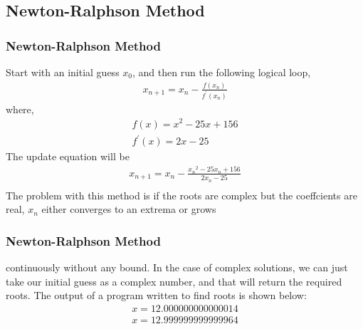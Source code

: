 \documentclass{beamer}
\providecommand{\brak}[1]{\ensuremath{\left(#1\right)}}
\theoremstyle{remark}
\numberwithin{equation}{section}
\begin{document}
    \subsection{Newton-Ralphson Method}
    \begin{frame}
      \frametitle{Newton-Ralphson Method}
      Start with an initial guess $x_0$, and then run the following logical loop,
      \begin{align}
        x_{n+1} = x_n - \frac{f\brak{x_n}}{f^{\prime}\brak{x_n}} 
      \end{align}
      where,
      \begin{align}
        f\brak{x} = x^2 - 25x + 156\\
        f^{\prime}\brak{x} = 2x - 25
      \end{align}
      The update equation will be
      \begin{align}
        x_{n+1} = x_n - \frac{{x_n}^2 - 25x_n + 156}{2x_n - 25}\\
      \end{align}
      The problem with this method is if the roots are complex but the coeffcients are real, $x_n$ either converges to an extrema or grows
    \end{frame}
    \begin{frame}
      \frametitle{Newton-Ralphson Method}
      continuously without any bound. 
      In the case of complex solutions, we can just take our initial guess as a complex number, and that will return the required roots.
      The output of a program written to find roots is shown below:
      \begin{align}
        x = 12.000000000000014 \\
        x = 12.999999999999964
      \end{align}    
    \end{frame}
\end{document}
